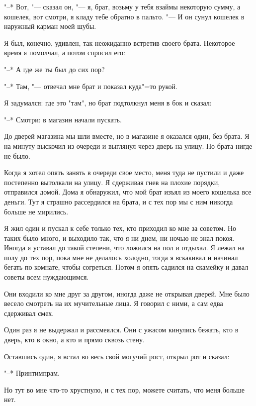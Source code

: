 "--* Вот, "--- сказал он, "---  я, брат, возьму у тебя взаймы некоторую сумму, а кошелек, вот смотри, я кладу тебе обратно в пальто. "--- И он сунул кошелек в наружный карман моей шубы.

Я был, конечно, удивлен, так неожиданно встретив своего брата. Некоторое время я помолчал, а потом спросил его:

"--* А где же ты был до сих пор?

"--* Там, "--- отвечал мне брат и показал куда"=то рукой.

Я задумался: где это "там", но брат подтолкнул меня в бок и сказал:

"--* Смотри: в магазин начали пускать.

До дверей магазина мы шли вместе, но в магазине я оказался один, без брата. Я на минуту выскочил из очереди и выглянул через дверь на улицу. Но брата нигде не было.

Когда я хотел опять занять в очереди свое место, меня туда не пустили и  даже постепенно вытолкали на улицу. Я сдерживая гнев на плохие порядки,  отправился домой. Дома я обнаружил, что мой брат изъял из моего кошелька все деньги. Тут я страшно рассердился на брата, и с тех пор мы с ним  никогда больше не мирились.

Я жил один и пускал к себе только тех, кто приходил ко мне за советом. Но таких было много, и выходило так, что я ни днем, ни ночью не знал покоя. Иногда я уставал до такой степени, что ложился на пол и отдыхал. Я лежал на полу до тех пор, пока мне не делалось холодно, тогда я вскакивал и начинал бегать по комнате, чтобы согреться. Потом я опять садился на скамейку и давал советы всем нуждающимся.

Они входили ко мне друг за другом, иногда даже не открывая дверей. Мне было весело смотреть на их мучительные лица. Я говорил с ними, а сам едва сдерживал смех.

Один раз я не выдержал и рассмеялся. Они с ужасом кинулись бежать, кто в дверь, кто в окно, а кто и прямо сквозь стену.

Оставшись один, я встал во весь свой могучий рост, открыл рот и сказал:

"--* Принтимпрам.

Но тут во мне что-то хрустнуло, и с тех пор, можете считать, что меня больше нет.
